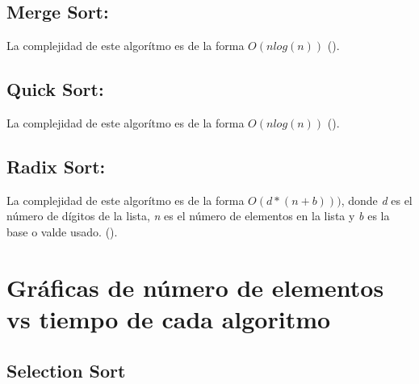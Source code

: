 \documentclass{report}
\begin{document}
	\subsection*{Merge Sort:}
	La complejidad de este algorítmo es de la forma $O(nlog(n))$ (\cite{digital1}). 
	\subsection*{Quick Sort:}
	La complejidad de este algorítmo es de la forma $O(nlog(n))$ (\cite{florez2018}).
	\subsection*{Radix Sort:}
	La complejidad de este algorítmo es de la forma $O(d*(n+b)))$, donde \textit{d} es el número de dígitos de la lista, \textit{n} es el número de elementos en la lista y \textit{b} es la base o valde usado. (\cite{unk1}).
	
	\section*{Gráficas de número de elementos vs tiempo de cada algoritmo}
	
	
	\subsection*{Selection Sort}
	\begin{center}
	\end{center}
	
\end{document}

